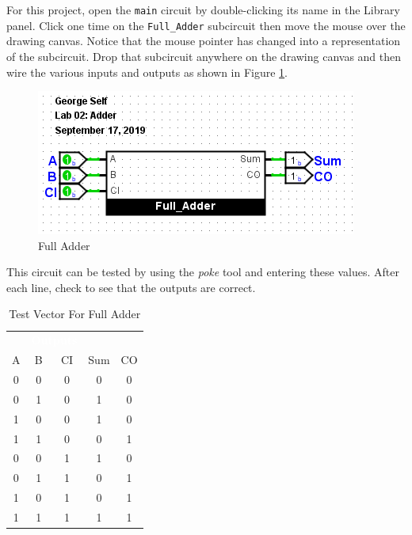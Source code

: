 For this project, open the \lstinline[columns=fixed]|main| circuit by double-clicking its name in the Library panel. Click one time on the \lstinline[columns=fixed]|Full_Adder| subcircuit then move the mouse over the drawing canvas. Notice that the mouse pointer has changed into a representation of the subcircuit. Drop that subcircuit anywhere on the drawing canvas and then wire the various inputs and outputs as shown in Figure \ref{fig:add-03}.

\begin{figure}[H]
	\centering
	\includegraphics[width=\maxwidth{.95\linewidth}]{gfx/add-03}
	\caption{Full Adder}
	\label{fig:add-03}
\end{figure}

This circuit can be tested by using the \textit{poke} tool and entering these values. After each line, check to see that the outputs are correct.

\begin{table}[H]
	\sffamily
	\newcommand{\head}[1]{\textcolor{white}{\textbf{#1}}}		
	\begin{center}
		\begin{tabular}{ccccc} 
			\rowcolor{black!75}
			\multicolumn{3}{c}{\head{Inputs}} & \multicolumn{2}{c}{\head{Outputs}} \\
			A & B & CI & Sum & CO \\
			\hline
			0 & 0 & 0 & 0 & 0 \\
			0 & 1 & 0 & 1 & 0 \\
			1 & 0 & 0 & 1 & 0 \\
			1 & 1 & 0 & 0 & 1 \\
			0 & 0 & 1 & 1 & 0 \\
			0 & 1 & 1 & 0 & 1 \\
			1 & 0 & 1 & 0 & 1 \\
			1 & 1 & 1 & 1 & 1 \\
		\end{tabular}
	\end{center}
	\caption{Test Vector For Full Adder}
	\label{tab:intro-01}
\end{table}

